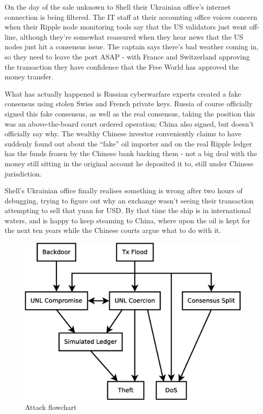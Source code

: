 \documentclass{article}
\begin{document}
On the day of the sale unknown to Shell their Ukrainian office's internet
connection is being filtered. The IT staff at their accounting office voices
concern when their Ripple node monitoring tools say that the US validators just
went off-line, although they're somewhat reassured when they hear news that the
US nodes just hit a consensus issue. The captain says there's bad weather
coming in, so they need to leave the port ASAP - with France and Switzerland
approving the transaction they have confidence that the Free World has approved
the money transfer.

What has actually happened is Russian cyberwarfare experts created a fake
consensus using stolen Swiss and French private keys. Russia of course
officially signed this fake consensus, as well as the real consensus, taking
the position this was an above-the-board court ordered operation; China also
signed, but doesn't officially say why. The wealthy Chinese investor
conveniently claims to have suddenly found out about the ``fake'' oil importer
and on the real Ripple ledger has the funds frozen by the Chinese bank backing
them - not a big deal with the money still sitting in the original account he
deposited it to, still under Chinese jurisdiction.

Shell's Ukrainian office finally realises something is wrong after two hours of
debugging, trying to figure out why an exchange wasn't seeing their transaction
attempting to sell that yuan for USD. By that time the ship is in international
waters, and is happy to keep steaming to China, where upon the oil is kept for
the next ten years while the Chinese courts argue what to do with it.

\begin{figure}
    \centering
    \includegraphics[scale=0.5]{figures/attack-flowchart.eps}
    \caption{Attack flowchart}
    \label{fig:attack-flowchart}
\end{figure}
\end{document}
